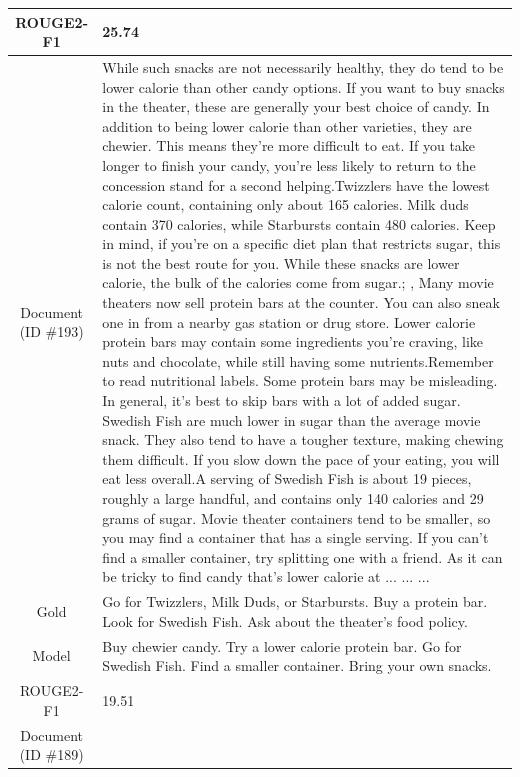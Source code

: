 \begin{table}[bth!]
\begin{tabular}{c|p{}}
\\ \hline
ROUGE2-F1 & 
25.74
\\ \hline
\makecell{Document\\(ID \#193)} & 
While such snacks are not necessarily healthy, they do tend to be lower calorie than other candy options. If you want to buy snacks in the theater, these are generally your best choice of candy. In addition to being lower calorie than other varieties, they are chewier. This means they're more difficult to eat. If you take longer to finish your candy, you're less likely to return to the concession stand for a second helping.Twizzlers have the lowest calorie count, containing only about 165 calories. Milk duds contain 370 calories, while Starbursts contain 480 calories. Keep in mind, if you're on a specific diet plan that restricts sugar, this is not the best route for you. While these snacks are lower calorie, the bulk of the calories come from sugar.; , Many movie theaters now sell protein bars at the counter. You can also sneak one in from a nearby gas station or drug store. Lower calorie protein bars may contain some ingredients you're craving, like nuts and chocolate, while still having some nutrients.Remember to read nutritional labels. Some protein bars may be misleading. In general, it's best to skip bars with a lot of added sugar. Swedish Fish are much lower in sugar than the average movie snack. They also tend to have a tougher texture, making chewing them difficult. If you slow down the pace of your eating, you will eat less overall.A serving of Swedish Fish is about 19 pieces, roughly a large handful, and contains only 140 calories and 29 grams of sugar. Movie theater containers tend to be smaller, so you may find a container that has a single serving. If you can't find a smaller container, try splitting one with a friend. As it can be tricky to find candy that's lower calorie at ... ... ... 
\\ \hline
Gold & 
Go for Twizzlers, Milk Duds, or Starbursts. Buy a protein bar. Look for Swedish Fish. Ask about the theater's food policy.
\\ \hline
Model & 
Buy chewier candy. Try a lower calorie protein bar. Go for Swedish Fish. Find a smaller container. Bring your own snacks.
\\ \hline
ROUGE2-F1 & 
19.51
\\ \hline
\makecell{Document\\(ID \#189)} & 

\end{tabular}
\end{table}
